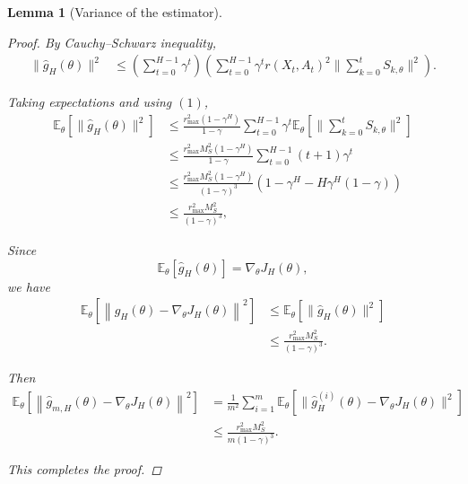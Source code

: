 \documentclass{article}
\newtheorem{lem}[thm]{Lemma}
\theoremstyle{definition}
\theoremstyle{remark}
\theoremstyle{mystyle}
\newcommand{\1}{\mathbbm{1}}
\begin{document}
\begin{lem}[Variance of the estimator]
\begin{proof}
By Cauchy--Schwarz inequality,
\[
\begin{aligned}
\|\widehat g_H(\theta)\|^2
&\le
\left(
\sum_{t=0}^{H-1}\gamma^t
\right)
\left(
\sum_{t=0}^{H-1}
\gamma^t
r(X_t,A_t)^2
\|\sum_{k=0}^t S_{k,\theta}\|^2
\right).
\end{aligned}
\]

Taking expectations and using \((1)\),
\[
\begin{aligned}
\mathbb E_\theta
\left[
\|\widehat g_H(\theta)\|^2
\right]
&\le
\frac{r_{\max}^2(1-\gamma^H)}{1-\gamma}
\sum_{t=0}^{H-1}
\gamma^t
\mathbb E_\theta
\left[
\|\sum_{k=0}^t S_{k,\theta}\|^2
\right]
\\
&\le
\frac{r_{\max}^2M_S^2(1-\gamma^H)}{1-\gamma}
\sum_{t=0}^{H-1}
(t+1)\gamma^t
\\
&\le
\frac{r_{\max}^2M_S^2(1-\gamma^H)}{(1-\gamma)^3}\left(1-\gamma^H-H\gamma^H(1-\gamma)\right)
\\
&\le
\frac{r_{\max}^2M_S^2}{(1-\gamma)^3},
\end{aligned}
\tag{3}
\]

Since
\[
\mathbb E_\theta[\widehat g_H(\theta)]
=
\nabla_\theta J_H(\theta),
\]
we have
\[
\begin{aligned}
\mathbb E_\theta
\left[
\left\|
\widehat g_H(\theta)
-
\nabla_\theta J_H(\theta)
\right\|^2
\right]
&\le
\mathbb E_\theta
\left[
\|\widehat g_H(\theta)\|^2
\right]
\\
&\le
\frac{r_{\max}^2M_S^2}{(1-\gamma)^3}.
\end{aligned}
\]

Then
\[
\begin{aligned}
\mathbb E_\theta
\left[
\left\|
\widehat g_{m,H}(\theta)
-
\nabla_\theta J_H(\theta)
\right\|^2
\right]
&=
\frac{1}{m^2}
\sum_{i=1}^m
\mathbb E_\theta[\|\widehat g_H^{(i)}(\theta)
-
\nabla_\theta J_H(\theta)\|^2]
\\
&\le
\frac{r_{\max}^2M_S^2}
{m(1-\gamma)^3}.
\end{aligned}
\]

This completes the proof.
\end{proof}    
\end{lem}
\end{document}
